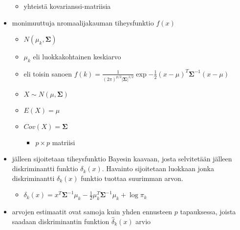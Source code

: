 \begin{itemize}
\begin{itemize}
        \item yhteistä kovarianssi-matriisia
    \end{itemize}
    \item monimuuttuja nromaalijakauman tiheysfunktio $f(x)$
    \begin{itemize}
        \item $N(\mu_k, \pmb{\Sigma})$
        \item $\mu_k$ eli luokkakohtainen keskiarvo
        \item eli toisin sanoen $f(k) = \frac{1}{(2\pi)^{p/2} |\pmb{\Sigma}|^{1/2}} \exp{-\frac{1}{2} (x - \mu)^T \pmb{\Sigma}^{-1} (x - \mu)}$
        \item $X \sim N(\mu, \pmb{\Sigma})$
        \item $E(X) = \mu$
        \item $Cov(X) = \pmb{\Sigma}$
        \begin{itemize}
            \item $p \times p$ matriisi
        \end{itemize}
    \end{itemize}
    \item jälleen sijoitetaan tiheysfunktio Bayesin kaavaan, josta selvitetään jälleen diskriminantti funktio $\delta_k(x)$. Havainto sijoitetaan luokkaan jonka diskriminantti $\delta_k(x)$ funktio tuottaa suurimman arvon.
    \begin{itemize}
        \item $\delta_k(x) = x^T \pmb{\Sigma}^{-1} \mu_k - \frac{1}{2} \mu_k^T \pmb{\Sigma}^{-1} \mu_k + \log \pi_k$
    \end{itemize}
    \item arvojen estimaatit ovat samoja kuin yhden ennusteen $p$ tapauksessa, joista saadaan diskriminantin funktion $\hat{\delta}_k(x)$ arvio
\end{itemize}

